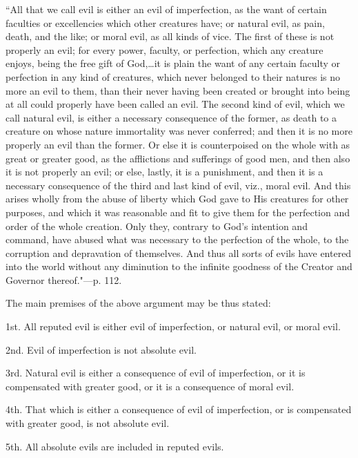 \documentclass[oneside]{book}
\begin{document}
``All that we call evil is either an evil of imperfection, as the
want of certain faculties or excellencies which other creatures
have; or natural evil, as pain, death, and the like; or moral evil,
as all kinds of vice. The first of these is not properly an evil;
for every power, faculty, or perfection, which any creature enjoys,
being the free gift of God,\dots it is plain the want of any certain
faculty or perfection in any kind of creatures, which never belonged
to their natures is no more an evil to them, than their
never having been created or brought into being at all could properly
have been called an evil. The second kind of evil, which
we call natural evil, is either a necessary consequence of the
former, as death to a creature on whose nature immortality was
never conferred; and then it is no more properly an evil than the
former. Or else it is counterpoised on the whole with as great
or greater good, as the afflictions and sufferings of good men,
and then also it is not properly an evil; or else, lastly, it is a
punishment, and then it is a necessary consequence of the third
and last kind of evil, viz., moral evil. And this arises wholly
from the abuse of liberty which God gave to His creatures for
other purposes, and which it was reasonable and fit to give them
for the perfection and order of the whole creation. Only they,
contrary to God's intention and command, have abused what was
necessary to the perfection of the whole, to the corruption and
depravation of themselves. And thus all sorts of evils have entered into the world without any diminution to the infinite goodness of the Creator and Governor thereof."---p. 112.

The main premises of the above argument may be thus
stated:

1st. All reputed evil is either evil of imperfection, or natural
evil, or moral evil.

2nd. Evil of imperfection is not absolute evil.

3rd. Natural evil is either a consequence of evil of imperfection, or it is compensated with greater good, or it is a consequence of moral evil.

4th. That which is either a consequence of evil of imperfection, or is compensated with greater good, is not absolute evil.

5th. All absolute evils are included in reputed evils.
\end{document}

